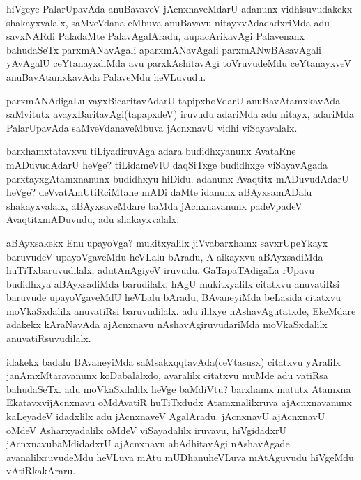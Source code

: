 \begin{artha}
hiVgeye PalarUpavAda anuBavaveV jAcnxnaveMdarU adanunx vidhisuvudakekx
shakayxvalalx, saMveVdana eMbuva anuBavavu nitayxvAdadadxriMda adu
savxNARdi Pala\-daMte PalavAgalAradu, aupacArikavAgi Palavenanx
bahudaSeTx parxmANavAgali \break aparxmANavAgali parxmANwBAsavAgali yAvAgalU
ceYtanayxdiMda avu parxkAshita\-vAgi toVruvudeMdu ceYtanayxveV
anuBavAtamxkavAda PalaveMdu heVLuvudu.

parxmANAdigaLu vayxBicaritavAdarU tapipxhoVdarU anuBavAtamxkavAda
saMvitutx avayxBaritavAgi(tapapxdeV) iruvudu adariMda adu nitayx,
adariMda PalarUpavAda saMveVdanaveMbuva jAcnxnavU vidhi viSayavalalx.
\end{artha}

\centerline{}

\begin{artha}
barxhamxtatavxvu tiLiyadiruvAga adara budidhxyanunx AvataRne
mADuvudAdarU heVge? tiLidameVlU daqSiTxge budidhxge viSayavAgada
parxtayxgAtamxnanunx budidhxyu hiDidu. adanunx Avaqtitx mADuvudAdarU
heVge? deVvatAmUtiRciMtane mADi daMte idanunx aBAyxsamADalu
shakayxvalalx, aBAyxsaveMdare baMda jAcnxnavanunx padeVpadeV
AvaqtitxmADuvudu, adu shakayxvalalx.
\end{artha}

\centerline{}

\begin{artha}
aBAyxsakekx Enu upayoVga? mukitxyalilx jiVvabarxhamx savxrUpeYkayx
baruvudeV upayoVgaveMdu heVLalu bAradu, A aikayxvu aBAyxsadiMda
huTiTxbaruvudilalx, adutAnAgiyeV iruvudu. GaTapaTAdigaLa rUpavu
budidhxya aBAyxsadiMda barudilalx, hAgU mukitxyalilx citatxvu
anuvatiRsi baruvude upayoVgaveMdU heVLalu bAradu, BAvaneyiMda beLasida
citatxvu moVkaSxdalilx anuvatiRsi baruvudilalx. adu ililxye
nAshavAgutatxde, EkeMdare adakekx kAraNavAda ajAcnxnavu
nAshavAgiruvudariMda moVkaSxdalilx anuvatiRsuvudilalx.

idakekx badalu BAvaneyiMda saMsakxqqtavAda(ceVtasusx) citatxvu
yAralilx janAmxMtaravanunx koDabalalxdo, avaralilx citatxvu muMde adu
vatiRsa bahudaSeTx. adu moVkaSxdalilx heVge baMdiVtu? barxhamx matutx
Atamxna EkatavxvijAcnxnavu oMdAvatiR huTiTxdudx Atamxnalilxruva
ajAcnxnavanunx kaLeyadeV idadxlilx adu jAcnxnaveV
AgalAradu. jAcnxnavU ajAcnxnavU oMdeV Asharxyadalilx oMdeV
viSayadalilx iruvavu, hiVgidadxrU jAcnxnavubaMdidadxrU ajAcnxnavu
abAdhitavAgi nAshavAgade avanalilxruvudeMdu heVLuva mAtu mUDhanuheVLuva
mAtAguvudu hiVgeMdu vAtiRkakAraru.
\end{artha}

